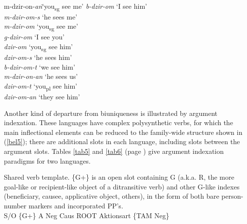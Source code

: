 \documentclass[output=paper,hidelinks]{langscibook}
\begin{document}
\ea \label{bel4}\\
\begin{multicols}{2}
\begin{tabbing}
m-dzir-on-\emph{an\hspace{2\tabcolsep}}\=‘you\textsubscript{sg} see me’\kill
\emph{b-dzir-om}    \> ‘I see him’\\
\emph{m-dzir-om-s}  \> ‘he sees me’\\
\emph{m-dzir-om}    \> ‘you\textsubscript{sg} see me’\\
\emph{g-dzir-om}    \> ‘I see you’\\
\emph{dzir-om}      \> ‘you\textsubscript{sg} see him’\\
\emph{dzir-om-s}    \> ‘he sees him’\\
\emph{b-dzir-om-t}  \> ‘we see him’\\
\emph{m-dzir-on-an} \> ‘he sees us’\\
\emph{dzir-om-t}    \> ‘you\textsubscript{pl} see him’\\
\emph{dzir-om-an}   \> ‘they see him’ \\
\end{tabbing}
\end{multicols}
 \z
{}

Another kind of departure from biuniqueness is illustrated by  argument indexation.  These languages have complex polysynthetic verbs, for which the main inflectional elements can be reduced to the family-wide structure shown in (\ref{bel5}); there are additional slots in each language, including slots between the argument slots. Tables \ref{tab5} and \ref{tab6} (page \pageref{tab5}) give argument indexation paradigms for two languages.

\ea \label{bel5}Shared  verb template.  \{G+\} is an open slot containing G (a.k.a. R, the more goal-like or recipient-like object of a ditransitive verb) and other G-like indexes (beneficiary, causee, applicative object, others), in the form of both bare person-number markers and incorporated PP's.\medskip\\ 
	S/O \quad  \{G+\} \quad  A \quad  Neg \quad Caus \quad ROOT \quad Aktionsart \quad \{TAM Neg\}
\z
\end{document}
